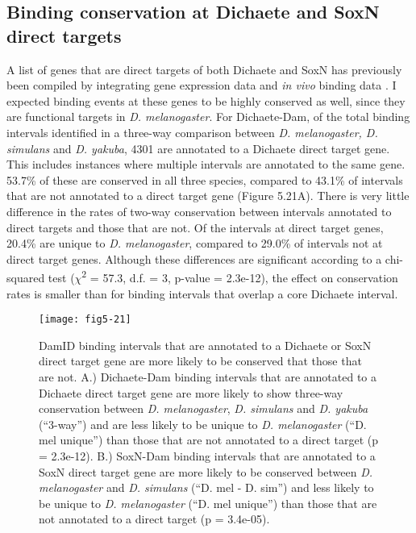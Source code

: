 \subsection{Binding conservation at Dichaete and SoxN direct targets}
A list of genes that are direct targets of both Dichaete and SoxN has previously been compiled by integrating gene expression data and \emph{in vivo} binding data \citep{aleksic_role_2013,ferrero_soxneuro_2014}. I expected binding events at these genes to be highly conserved as well, since they are functional targets in \emph{D. melanogaster}. For Dichaete-Dam, of the total binding intervals identified in a three-way comparison between \emph{D. melanogaster, D. simulans} and \emph{D. yakuba}, 4301 are annotated to a Dichaete direct target gene. This includes instances where multiple intervals are annotated to the same gene. 53.7\% of these are conserved in all three species, compared to 43.1\% of intervals that are not annotated to a direct target gene (Figure 5.21A). There is very little difference in the rates of two-way conservation between intervals annotated to direct targets and those that are not. Of the intervals at direct target genes, 20.4\% are unique to \emph{D. melanogaster}, compared to 29.0\% of intervals not at direct target genes. Although these differences are significant according to a chi-squared test (\(\chi\)\textsuperscript{2} = 57.3, d.f. = 3, p-value = 2.3e-12), the effect on conservation rates is smaller than for binding intervals that overlap a core Dichaete interval.\\

\begin{figure}
\centering
\texttt{[image: fig5-21]}
\caption{DamID binding intervals that are annotated to a Dichaete or SoxN direct target gene are more likely to be conserved that those that are not. A.) Dichaete-Dam binding intervals that are annotated to a Dichaete direct target gene are more likely to show three-way conservation between \emph{D. melanogaster}, \emph{D. simulans} and \emph{D. yakuba} (“3-way”) and are less likely to be unique to \emph{D. melanogaster} (“D. mel unique”) than those that are not annotated to a direct target (p = 2.3e-12). B.) SoxN-Dam binding intervals that are annotated to a SoxN direct target gene are more likely to be conserved between \emph{D. melanogaster} and \emph{D. simulans} (“D. mel - D. sim”) and less likely to be unique to \emph{D. melanogaster} (“D. mel unique”) than those that are not annotated to a direct target (p = 3.4e-05).}
\label{Figure 5.21}
\end{figure}


